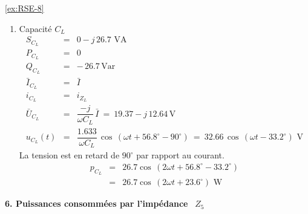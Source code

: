 \begin{solexercise}{\ref{ex:RSE-8}}
\begin{enumerate}
\begin{xalignat*}{2}
	\end{xalignat*}
	\begin{eqnarray*}
		\bar{U}_{R_L} &=& R_L \bar{I} \: = \: 9.75 + j\, 14.9 \,\, \text{V}\\
		u_{R_L} &=& R_L i_{R_L} \: = \:  25.197 \, \cos\, (\omega t + 56.8^{\circ}) \,\, \text{V}
	\end{eqnarray*}
	Le courant \ $i_{R_L}$ \ et la tension \ $u_{R_L}$  \ sont bien évidemment en phase.
	\begin{eqnarray*}
		p_{R_L} &=& 20.6 + 20.6 \cos\, (2\omega t + 56.8^{\circ} + 56.8^{\circ} )\\
		&=& 20.6 + 20.6 \cos \, (2\omega t + 113.6^{\circ}) \, \, \text{W}~.
	\end{eqnarray*}
	
	\item Capacité $C_L$
	\begin{eqnarray*}
		S_{C_L} &=& 0 - j\, 26.7\,\, \text{VA}\\
		P_{C_L} &=& 0 \\
		Q_{C_L} &=& -\, 26.7 \, \text{Var}\\
		\bar{I}_{C_L} &=& \bar{I}\\
		i_{C_L} &=& i_{Z_L}\\
		\bar{U}_{C_L} &=& \dfrac{-j}{\omega C_L} \, \bar{I} \: = \: 19.37 - j\, 12.64 \, \text{V}\\
		u_{C_L}(t) &=& \dfrac{1.633}{\omega C_L} \, \cos \, (\omega t + 56.8^{\circ} - 90^{\circ})
		\: = \: 32.66\, \cos \, (\omega t - 33.2^{\circ}) \,\, \text{V}
	\end{eqnarray*}
	La tension est en retard de $90^{\circ}$ par rapport au courant.
	\begin{eqnarray*}
		p_{C_L} &=& 26.7  \cos \,(2\omega t + 56.8^{\circ} - 33.2^{\circ})\\
		&=& 26.7 \cos \, (2\omega t + 23.6^{\circ}) \,\, \text{W}
	\end{eqnarray*}
\end{enumerate}
{\bf 6. Puissances consommées par l'impédance} \ $Z_5$


\end{solexercise}
